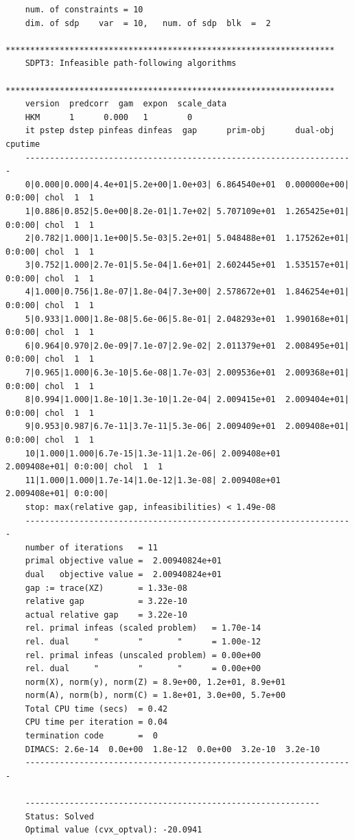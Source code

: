 \documentclass[letter]{article}
\begin{document}
\begin{Verbatim}
	num. of constraints = 10
	dim. of sdp    var  = 10,   num. of sdp  blk  =  2
	*******************************************************************
	SDPT3: Infeasible path-following algorithms
	*******************************************************************
	version  predcorr  gam  expon  scale_data
	HKM      1      0.000   1        0    
	it pstep dstep pinfeas dinfeas  gap      prim-obj      dual-obj    cputime
	-------------------------------------------------------------------
	0|0.000|0.000|4.4e+01|5.2e+00|1.0e+03| 6.864540e+01  0.000000e+00| 0:0:00| chol  1  1 
	1|0.886|0.852|5.0e+00|8.2e-01|1.7e+02| 5.707109e+01  1.265425e+01| 0:0:00| chol  1  1 
	2|0.782|1.000|1.1e+00|5.5e-03|5.2e+01| 5.048488e+01  1.175262e+01| 0:0:00| chol  1  1 
	3|0.752|1.000|2.7e-01|5.5e-04|1.6e+01| 2.602445e+01  1.535157e+01| 0:0:00| chol  1  1 
	4|1.000|0.756|1.8e-07|1.8e-04|7.3e+00| 2.578672e+01  1.846254e+01| 0:0:00| chol  1  1 
	5|0.933|1.000|1.8e-08|5.6e-06|5.8e-01| 2.048293e+01  1.990168e+01| 0:0:00| chol  1  1 
	6|0.964|0.970|2.0e-09|7.1e-07|2.9e-02| 2.011379e+01  2.008495e+01| 0:0:00| chol  1  1 
	7|0.965|1.000|6.3e-10|5.6e-08|1.7e-03| 2.009536e+01  2.009368e+01| 0:0:00| chol  1  1 
	8|0.994|1.000|1.8e-10|1.3e-10|1.2e-04| 2.009415e+01  2.009404e+01| 0:0:00| chol  1  1 
	9|0.953|0.987|6.7e-11|3.7e-11|5.3e-06| 2.009409e+01  2.009408e+01| 0:0:00| chol  1  1 
	10|1.000|1.000|6.7e-15|1.3e-11|1.2e-06| 2.009408e+01  2.009408e+01| 0:0:00| chol  1  1 
	11|1.000|1.000|1.7e-14|1.0e-12|1.3e-08| 2.009408e+01  2.009408e+01| 0:0:00|
	stop: max(relative gap, infeasibilities) < 1.49e-08
	-------------------------------------------------------------------
	number of iterations   = 11
	primal objective value =  2.00940824e+01
	dual   objective value =  2.00940824e+01
	gap := trace(XZ)       = 1.33e-08
	relative gap           = 3.22e-10
	actual relative gap    = 3.22e-10
	rel. primal infeas (scaled problem)   = 1.70e-14
	rel. dual     "        "       "      = 1.00e-12
	rel. primal infeas (unscaled problem) = 0.00e+00
	rel. dual     "        "       "      = 0.00e+00
	norm(X), norm(y), norm(Z) = 8.9e+00, 1.2e+01, 8.9e+01
	norm(A), norm(b), norm(C) = 1.8e+01, 3.0e+00, 5.7e+00
	Total CPU time (secs)  = 0.42  
	CPU time per iteration = 0.04  
	termination code       =  0
	DIMACS: 2.6e-14  0.0e+00  1.8e-12  0.0e+00  3.2e-10  3.2e-10
	-------------------------------------------------------------------
	
	------------------------------------------------------------
	Status: Solved
	Optimal value (cvx_optval): -20.0941
	

\end{Verbatim}
\end{document}
